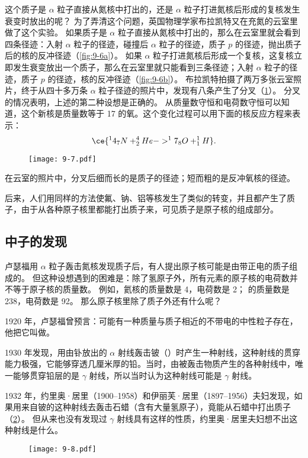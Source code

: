 这个质子是 $\alpha$ 粒子直接从氮核中打出的，还是 $\alpha$ 粒子打进氮核后形成的复核发生衰变时放出的呢？
为了弄清这个问题，英国物理学家布拉凯特又在充氮的云室里做了这个实验。
如果质子是 $\alpha$ 粒子直接从氮核中打出的，那么在云室里就会看到四条径迹：入射 $\alpha$ 粒子的径迹，碰撞后 $\alpha$ 粒子的径迹，质子 $p$ 的径迹，抛出质子后的核的反冲径迹（\cref{fig:9-6a}）。
如果 $\alpha$ 粒子打进氮核后形成一个复核，这复核立即发生衰变放出一个质子，那么在云室里就只能看到三条径迹；入射 $\alpha$ 粒子的径迹，质子 $p$ 的径迹，核的反冲径迹（\cref{fig:9-6b}）。
布拉凯特拍摄了两万多张云室照片，终于从四十多万条 $\alpha$ 粒子径迹的照片中，发现有八条产生了分叉（\cref{fig:9-7}）。
分叉的情况表明，上述的第二种设想是正确的。
从质量数守恒和电荷数守恒可以知道，这个新核是质量数等于 17 的氧。这个变化过程可以用下面的核反应方程来表示：
\[ \ce{ ^14_7 N + ^4_2 He -> ^17_8O + ^1_1 H }.\]
\begin{figure}
\texttt{[image: 9-7.pdf]}
\caption{}\label{fig:9-7}
\end{figure}

在云室的照片中，分叉后细而长的是质子的径迹；短而粗的是反冲氧核的径迹。

后来，人们用同样的方法使氟、钠、铝等核发生了类似的转变，并且都产生了质子，由于从各种原子核里都能打出质子来，可见质子是原子核的组成部分。

\subsection{中子的发现}
卢瑟福用 $\alpha$ 粒子轰击氮核发现质子后，有人提出原子核可能是由带正电的质子组成的。
但这种设想遇到的困难是：除了氢原子外，所有元素的原子核的电荷数并不等于原子核的质量数。
例如，氦核的质量数是 4，电荷数是 2； 的质量数是 238，电荷数是 92。
那么原子核里除了质子外还有什么呢？

1920 年，卢瑟福曾预言：可能有一种质量与质子相近的不带电的中性粒子存在，他把它叫做。

1930 年发现，用由钋放出的 $\alpha$ 射线轰击铍（）时产生一种射线，这种射线的贯穿能力极强，它能够穿透几厘米厚的铅。当时，由被轰击物质产生的各种射线中，唯一能够贯穿铅层的是 $\gamma$ 射线，所以当时认为这种射线可能是 $\gamma$ 射线。

1932 年，约里奥·居里（1900--1958）和伊丽芙·居里（1897--1956）夫妇发现，如果用来自铍的这种射线去轰击石蜡（含有大量氢原子），竟能从石蜡中打出质子（\cref{fig:9-8}）。
但从来也没有发现过 $\gamma$ 射线具有这样的性质，约里奥·居里夫妇想不出这种射线是什么。
\begin{figure}
  \texttt{[image: 9-8.pdf]}
  \caption{}\label{fig:9-8}
\end{figure}

